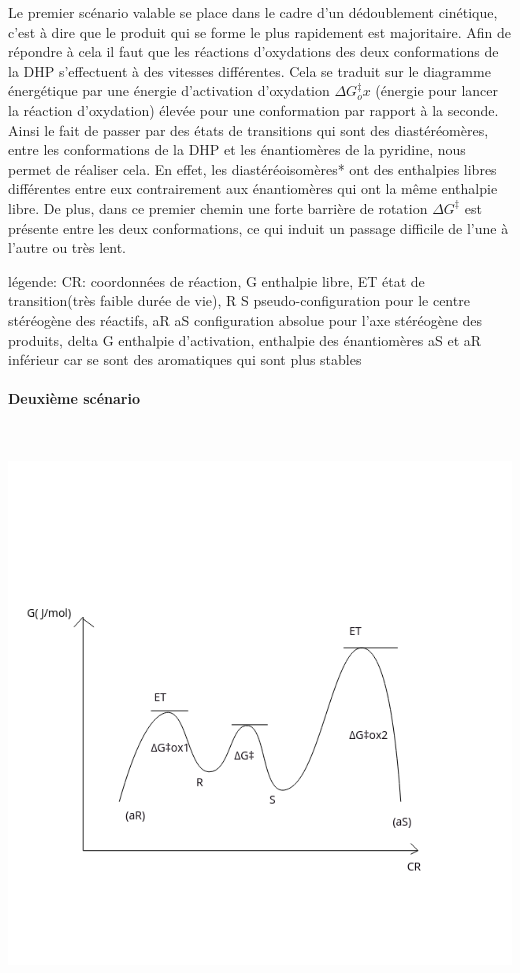 \documentclass{article}
\newcommand{\pparagraph}[1]{\paragraph{#1}\mbox{}\\}
\begin{document}
Le premier scénario valable se place dans le cadre d’un dédoublement cinétique, c’est à dire que le produit qui se forme le plus rapidement est majoritaire. Afin de répondre à cela il faut que les réactions d'oxydations des deux conformations de la DHP s'effectuent à des vitesses différentes. Cela se traduit sur le diagramme énergétique par une énergie d’activation d’oxydation $\Delta G^\ddagger_ox$ (énergie pour lancer la réaction d’oxydation) élevée pour une conformation par rapport à la seconde. Ainsi le fait de passer par des états de transitions qui sont des diastéréomères, entre les conformations de la DHP et les énantiomères de la pyridine, nous permet de réaliser cela. En effet, les diastéréoisomères* ont des enthalpies libres différentes entre eux contrairement aux énantiomères qui ont la même enthalpie libre. De plus, dans ce premier chemin une forte barrière de rotation $\Delta G^\ddagger$ est présente entre les deux conformations, ce qui induit un passage difficile de l'une à l'autre ou très lent.
\medbreak

légende: CR: coordonnées de réaction, G enthalpie libre, ET état de transition(très faible durée de vie), R S pseudo-configuration pour le centre stéréogène des réactifs, aR aS configuration absolue pour l’axe stéréogène des produits, delta G enthalpie d’activation, enthalpie des énantiomères aS et aR inférieur car se sont des aromatiques qui sont plus stables
   
\medbreak
 

\pparagraph{Deuxième scénario}

\begin{center}
\includegraphics[scale = 0.5]{BadCurve}
\end{center}
\end{document}
